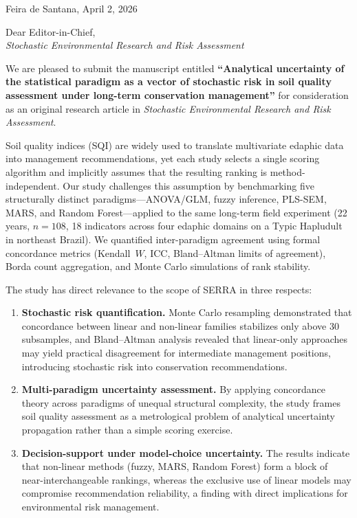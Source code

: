 \documentclass[12pt,a4paper]{article}
\begin{document}
\noindent
Feira de Santana, April 2, 2026

\bigskip

\noindent
Dear Editor-in-Chief,\\
\textit{Stochastic Environmental Research and Risk Assessment}

\bigskip

\noindent
We are pleased to submit the manuscript entitled \textbf{``Analytical uncertainty of the statistical paradigm as a vector of stochastic risk in soil quality assessment under long-term conservation management''} for consideration as an original research article in \textit{Stochastic Environmental Research and Risk Assessment}.

\medskip

\noindent
Soil quality indices (SQI) are widely used to translate multivariate edaphic data into management recommendations, yet each study selects a single scoring algorithm and implicitly assumes that the resulting ranking is method-independent. Our study challenges this assumption by benchmarking five structurally distinct paradigms---ANOVA/GLM, fuzzy inference, PLS-SEM, MARS, and Random Forest---applied to the same long-term field experiment (22 years, $n = 108$, 18 indicators across four edaphic domains on a Typic Hapludult in northeast Brazil). We quantified inter-paradigm agreement using formal concordance metrics (Kendall~$W$, ICC, Bland--Altman limits of agreement), Borda count aggregation, and Monte Carlo simulations of rank stability.

\medskip

\noindent
The study has direct relevance to the scope of SERR\null A in three respects:

\begin{enumerate}
  \item \textbf{Stochastic risk quantification.} Monte Carlo resampling demonstrated that concordance between linear and non-linear families stabilizes only above 30 subsamples, and Bland--Altman analysis revealed that linear-only approaches may yield practical disagreement for intermediate management positions, introducing stochastic risk into conservation recommendations.
  \item \textbf{Multi-paradigm uncertainty assessment.} By applying concordance theory across paradigms of unequal structural complexity, the study frames soil quality assessment as a metrological problem of analytical uncertainty propagation rather than a simple scoring exercise.
  \item \textbf{Decision-support under model-choice uncertainty.} The results indicate that non-linear methods (fuzzy, MARS, Random Forest) form a block of near-interchangeable rankings, whereas the exclusive use of linear models may compromise recommendation reliability, a finding with direct implications for environmental risk management.
\end{enumerate}
\end{document}
